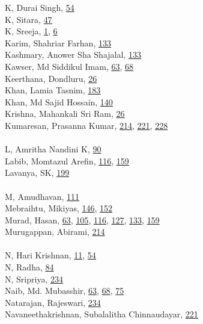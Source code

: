 \documentclass[11pt,oneside]{book}
\begin{document}
\begin{multicols}{2}
K, Durai Singh, \hyperlink{page.54}{54}\\
K, Sitara, \hyperlink{page.47}{47}\\
K, Sreeja, \hyperlink{page.1}{1}, \hyperlink{page.6}{6}\\
Karim, Shahriar Farhan, \hyperlink{page.133}{133}\\
Kashmary, Anower Sha Shajalal, \hyperlink{page.133}{133}\\
Kawser, Md Siddikul Imam, \hyperlink{page.63}{63}, \hyperlink{page.68}{68}\\
Keerthana, Dondluru, \hyperlink{page.26}{26}\\
Khan, Lamia Tasnim, \hyperlink{page.183}{183}\\
Khan, Md Sajid Hossain, \hyperlink{page.140}{140}\\
Krishna, Mahankali Sri Ram, \hyperlink{page.26}{26}\\
Kumaresan, Prasanna Kumar, \hyperlink{page.214}{214}, \hyperlink{page.221}{221}, \hyperlink{page.228}{228}\\
\\ %
L, Amritha Nandini K, \hyperlink{page.90}{90}\\
Labib, Momtazul Arefin, \hyperlink{page.116}{116}, \hyperlink{page.159}{159}\\
Lavanya, SK, \hyperlink{page.199}{199}\\
\\ %
M, Amudhavan, \hyperlink{page.111}{111}\\
Mebraihtu, Mikiyas, \hyperlink{page.146}{146}, \hyperlink{page.152}{152}\\
Murad, Hasan, \hyperlink{page.63}{63}, \hyperlink{page.105}{105}, \hyperlink{page.116}{116}, \hyperlink{page.127}{127}, \hyperlink{page.133}{133}, \hyperlink{page.159}{159}\\
Murugappan, Abirami, \hyperlink{page.214}{214}\\
\\ %
N, Hari Krishnan, \hyperlink{page.11}{11}, \hyperlink{page.54}{54}\\
N, Radha, \hyperlink{page.84}{84}\\
N, Sripriya, \hyperlink{page.234}{234}\\
Naib, Md. Mubasshir, \hyperlink{page.63}{63}, \hyperlink{page.68}{68}, \hyperlink{page.75}{75}\\
Natarajan, Rajeswari, \hyperlink{page.234}{234}\\
Navaneethakrishnan, Subalalitha Chinnaudayar, \hyperlink{page.221}{221}\\

\end{multicols}
\end{document}
